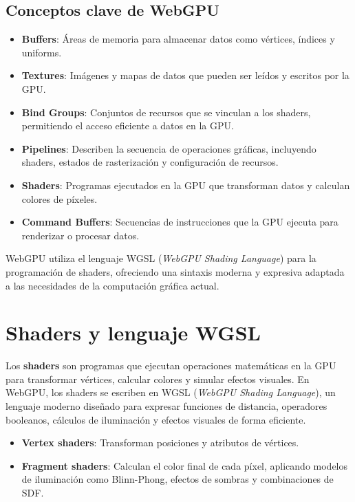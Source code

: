 \subsection{Conceptos clave de WebGPU}

\begin{itemize}
    \item \textbf{Buffers}: Áreas de memoria para almacenar datos como vértices, índices y uniforms.
    \item \textbf{Textures}: Imágenes y mapas de datos que pueden ser leídos y escritos por la GPU.
    \item \textbf{Bind Groups}: Conjuntos de recursos que se vinculan a los shaders, permitiendo el acceso eficiente a datos en la GPU.
    \item \textbf{Pipelines}: Describen la secuencia de operaciones gráficas, incluyendo shaders, estados de rasterización y configuración de recursos.
    \item \textbf{Shaders}: Programas ejecutados en la GPU que transforman datos y calculan colores de píxeles.
    \item \textbf{Command Buffers}: Secuencias de instrucciones que la GPU ejecuta para renderizar o procesar datos.
\end{itemize}

WebGPU utiliza el lenguaje WGSL (\textit{WebGPU Shading Language}) para la
programación de shaders, ofreciendo una sintaxis moderna y expresiva adaptada a
las necesidades de la computación gráfica actual.

\section{Shaders y lenguaje WGSL}

Los \textbf{shaders} son programas que ejecutan operaciones matemáticas en la
GPU para transformar vértices, calcular colores y simular efectos visuales. En
WebGPU, los shaders se escriben en WGSL (\textit{WebGPU Shading Language}), un
lenguaje moderno diseñado para expresar funciones de distancia, operadores
booleanos, cálculos de iluminación y efectos visuales de forma eficiente.

\begin{itemize}
    \item \textbf{Vertex shaders}: Transforman posiciones y atributos de vértices.
    \item \textbf{Fragment shaders}: Calculan el color final de cada píxel, aplicando modelos de iluminación como Blinn-Phong, efectos de sombras y combinaciones de SDF.
\end{itemize}

